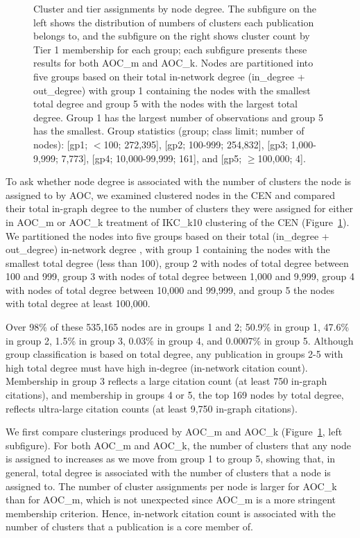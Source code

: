 \documentclass[12pt, oneside]{article}   	%
\begin{document}
\begin{figure}
\begin{subfigure}[t]{0.48\textwidth}
\end{subfigure}
\captionsetup{width=0.9\textwidth}	
\caption{Cluster and tier assignments by node degree. The subfigure on the left shows the distribution of numbers of clusters each publication belongs to, and the subfigure on the right shows cluster count by Tier 1 membership for each group; each subfigure presents these results for both AOC\_m and AOC\_k. Nodes are partitioned into five groups based on their total in-network degree (in\_degree + out\_degree) with group 1 containing the nodes with the smallest total degree and group 5 with the nodes with the largest total degree. Group 1 has the largest number of observations and group 5 has the smallest. Group statistics (group; class limit; number of nodes): [gp1; $<$100;  272,395], [gp2; 100-999; 254,832], [gp3; 1,000-9,999; 7,773], [gp4; 10,000-99,999; 161], and [gp5; $\geq$100,000; 4]. }
\label{fig:fig3}
\end{figure}
	
To ask whether node degree is associated with the number of clusters the node is assigned to by AOC, we examined clustered nodes in the CEN and compared their total in-graph degree to the number of clusters they were assigned for either in AOC\_m or AOC\_k treatment of IKC\_k10 clustering of the CEN (Figure~\ref{fig:fig3}). We partitioned the nodes into five groups based on their total (in\_degree + out\_degree) in-network degree ,  with group 1 containing the nodes with the smallest total degree (less than 100), group 2 with nodes of total degree between 100 and 999, group 3 with nodes of total degree between 1,000 and 9,999, group 4 with nodes of total degree between 10,000 and 99,999, and group 5 the nodes with total degree at least 100,000.

Over 98\% of these 535,165 nodes are in groups 1 and 2; 50.9\% in group 1, 47.6\% in group  2, 1.5\% in group 3,  0.03\% in group 4, and 0.0007\% in group 5. 
Although group classification is based on total degree,  any publication in groups 2-5 with high total degree must have high in-degree (in-network citation count). Membership in group 3  reflects a large citation count (at least 750 in-graph citations), and membership in groups 4 or 5, the top 169 nodes by total degree, reflects ultra-large citation counts (at least 9,750 in-graph citations).    
	
We first compare clusterings produced by AOC\_m and AOC\_k (Figure~\ref{fig:fig3}, left subfigure). For both AOC\_m and AOC\_k, the number of clusters that any node is assigned to increases as we move from group 1 to group 5, showing that, in general, total degree is associated with the number of clusters that a node is assigned to. The number of cluster assignments per node is larger for AOC\_k than for AOC\_m, which is not unexpected since AOC\_m is a more stringent membership criterion. Hence, in-network citation count is associated with the number of clusters that a publication is a core member of.
	
\end{document}
